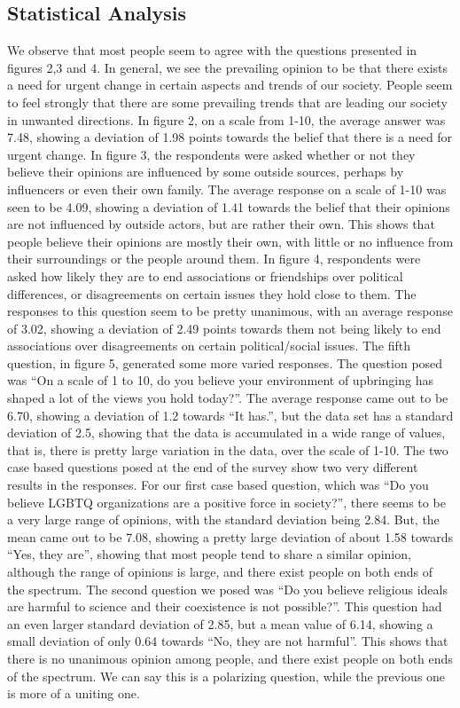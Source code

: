 \documentclass{article}
\begin{document}
\subsection{Statistical Analysis}
We observe that most people seem to agree with the questions presented in figures 2,3 and 4.
In general, we see the prevailing opinion to be that there exists a need for urgent change in certain aspects and trends of our society. People seem to feel strongly that there are some prevailing trends that are leading our society in unwanted directions. In figure 2, on a scale from 1-10, the average answer was 7.48, showing a deviation of 1.98 points towards the belief that there is a need for urgent change.
In figure 3, the respondents were asked whether or not they believe their opinions are influenced by some outside sources, perhaps by influencers or even their own family. The average response on a scale of 1-10 was seen to be 4.09, showing a deviation of 1.41 towards the belief that their opinions are not influenced by outside actors, but are rather their own. This shows that people believe their opinions are mostly their own, with little or no influence from their surroundings or the people around them.
In figure 4, respondents were asked how likely they are to end associations or friendships over political differences, or disagreements on certain issues they hold close to them. The responses to this question seem to be pretty unanimous, with an average response of 3.02, showing a deviation of 2.49 points towards them not being likely to end associations over disagreements on certain political/social issues. 
The fifth question, in figure 5, generated some more varied responses. The question posed was “On a scale of 1 to 10, do you believe your environment of upbringing has shaped a lot of the views you hold today?”. The average response came out to be 6.70, showing a deviation of 1.2 towards “It has.”, but the data set has a standard deviation of 2.5, showing that the data is accumulated in a wide range of values, that is, there is pretty large variation in the data, over the scale of 1-10. 
The two case based questions posed at the end of the survey show two very different results in the responses. For our first case based question, which was “Do you believe LGBTQ organizations are a positive force in society?”, there seems to be a very large range of opinions, with the standard deviation being 2.84. But, the mean came out to be 7.08, showing a pretty large deviation of about 1.58 towards “Yes, they are”, showing that most people tend to share a similar opinion, although the range of opinions is large, and there exist people on both ends of the spectrum. 
The second question we posed was “Do you believe religious ideals are harmful to science and their coexistence is not possible?”. This question had an even larger standard deviation of 2.85, but a mean value of 6.14, showing a small deviation of only 0.64 towards “No, they are not harmful”. This shows that there is no unanimous opinion among people, and there exist people on both ends of the spectrum. We can say this is a polarizing question, while the previous one is more of a uniting one. 
\end{document}
